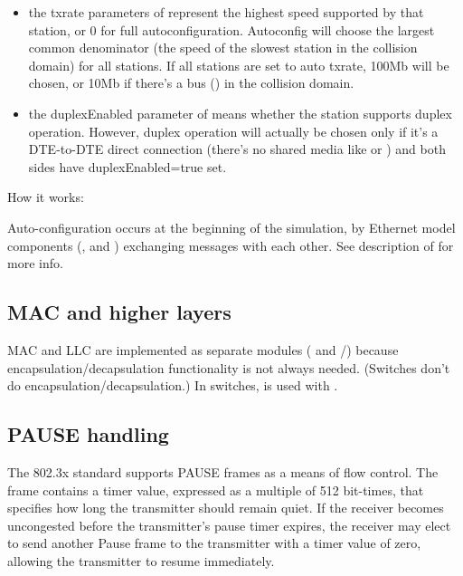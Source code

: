 \begin{itemize}
  \item the txrate parameters of  represent the highest speed supported
        by that station, or 0 for full autoconfiguration. Autoconfig will choose
        the largest common denominator (the speed of the slowest station in the
        collision domain) for all stations. If all stations are set to auto
        txrate, 100Mb will be chosen, or 10Mb if there's a bus () in
        the collision domain.
  \item the duplexEnabled parameter of  means whether the station supports
        duplex operation. However, duplex operation will actually be chosen only
        if it's a DTE-to-DTE direct connection (there's no shared media like
         or ) and both sides have duplexEnabled=true set.
\end{itemize}

How it works:

Auto-configuration occurs at the beginning of the simulation, by
Ethernet model components (,  and ) exchanging
 messages with each other. See description of 
for more info.

\subsection{MAC and higher layers}

MAC and LLC are implemented as separate modules ( and
/) because encapsulation/decapsulation functionality
is not always needed. (Switches don't do encapsulation/decapsulation.)
In switches,  is used with .

\subsection{PAUSE handling}

The 802.3x standard supports PAUSE frames as a means of flow
control. The frame contains a timer value, expressed as a multiple
of 512 bit-times, that specifies how long the transmitter should
remain quiet. If the receiver becomes uncongested before the
transmitter's pause timer expires, the receiver may elect to send
another Pause frame to the transmitter with a timer value of zero,
allowing the transmitter to resume immediately.

